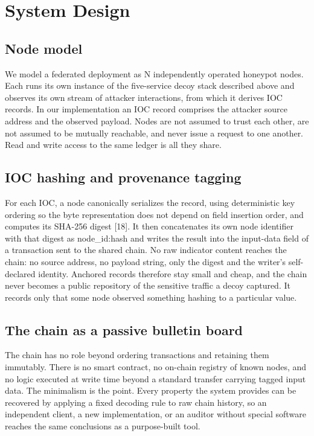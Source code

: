 \documentclass[conference]{IEEEtran}
\begin{document}
\section{System Design}

\subsection{Node model}

We model a federated deployment as N independently operated honeypot nodes. Each runs its own instance of the five-service decoy stack described above and observes its own stream of attacker interactions, from which it derives IOC records. In our implementation an IOC record comprises the attacker source address and the observed payload. Nodes are not assumed to trust each other, are not assumed to be mutually reachable, and never issue a request to one another. Read and write access to the same ledger is all they share.

\subsection{IOC hashing and provenance tagging}

For each IOC, a node canonically serializes the record, using deterministic key ordering so the byte representation does not depend on field insertion order, and computes its SHA-256 digest [18]. It then concatenates its own node identifier with that digest as node\_id:hash and writes the result into the input-data field of a transaction sent to the shared chain. No raw indicator content reaches the chain: no source address, no payload string, only the digest and the writer's self-declared identity. Anchored records therefore stay small and cheap, and the chain never becomes a public repository of the sensitive traffic a decoy captured. It records only that some node observed something hashing to a particular value.

\subsection{The chain as a passive bulletin board}

The chain has no role beyond ordering transactions and retaining them immutably. There is no smart contract, no on-chain registry of known nodes, and no logic executed at write time beyond a standard transfer carrying tagged input data. The minimalism is the point. Every property the system provides can be recovered by applying a fixed decoding rule to raw chain history, so an independent client, a new implementation, or an auditor without special software reaches the same conclusions as a purpose-built tool.
\end{document}
